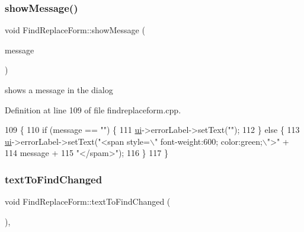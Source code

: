 \subsubsection{\texorpdfstring{show\+Message()}{showMessage()}}
{\footnotesize\ttfamily void Find\+Replace\+Form\+::show\+Message (\begin{DoxyParamCaption}\item[{const Q\+String \&}]{message }\end{DoxyParamCaption})\hspace{0.3cm}{\ttfamily [protected]}}



shows a message in the dialog 



Definition at line 109 of file findreplaceform.\+cpp.


\begin{DoxyCode}
109                                                         \{
110     \textcolor{keywordflow}{if} (message == \textcolor{stringliteral}{""}) \{
111         \hyperlink{class_find_replace_form_a9bf9e9096feff863dcd6c2a989e07d2c}{ui}->errorLabel->setText(\textcolor{stringliteral}{""});
112     \} \textcolor{keywordflow}{else} \{
113         \hyperlink{class_find_replace_form_a9bf9e9096feff863dcd6c2a989e07d2c}{ui}->errorLabel->setText(\textcolor{stringliteral}{"<span style=\(\backslash\)" font-weight:600; color:green;\(\backslash\)">"} +
114                                 message +
115                                 \textcolor{stringliteral}{"</spam>"});
116     \}
117 \}
\end{DoxyCode}
\mbox{\label{class_find_replace_form_a0fd7fa8014c190857e5c3be4392fc96a}} 
\subsubsection{\texorpdfstring{text\+To\+Find\+Changed}{textToFindChanged}}
{\footnotesize\ttfamily void Find\+Replace\+Form\+::text\+To\+Find\+Changed (\begin{DoxyParamCaption}{ }\end{DoxyParamCaption})\hspace{0.3cm}{\ttfamily [protected]}, {\ttfamily [slot]}}



